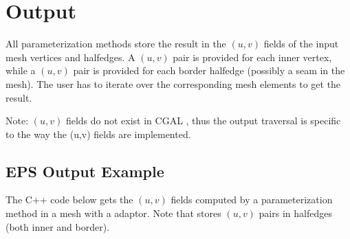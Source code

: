 \section{Output}

All parameterization methods store the result in the $(u,v)$ fields of
the input mesh vertices and halfedges. A $(u,v)$ pair is provided for
each inner vertex, while a $(u,v)$ pair is provided for each border
halfedge (possibly a seam in the mesh). The user has to iterate over
the corresponding mesh elements to get the result.

Note: $(u,v)$ fields do not exist in CGAL ,
thus the output traversal is specific to the way the (u,v) fields are implemented.

\subsection{EPS Output Example}

The C++ code below gets the $(u,v)$ fields computed by a
parameterization method in a  mesh with a
 adaptor.  Note that
 stores $(u,v)$ pairs in
halfedges (both inner and border).

